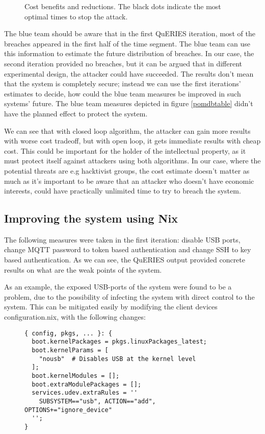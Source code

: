 \begin{figure}[t!]
\centerline{}
\caption{Cost benefits and reductions. The black dots indicate the
  most optimal times to stop the attack.}
\label{openandclosed}
\end{figure}

The blue team should be aware that in the first QuERIES iteration,
most of the breaches appeared in the first half of the time
segment. The blue team can use this information to estimate the future
distribution of breaches. In our case, the second iteration provided
no breaches, but it can be argued that in different experimental
design, the attacker could have succeeded. The results don't mean
that the system is completely secure; instead we can use the first
iterations' estimates to decide, how could the blue team measures be
improved in such systems' future. The blue team measures depicted in
figure \ref{pomdbtable} didn't have the planned effect to protect the
system. 

We can see that with closed loop algorithm, the attacker can gain more
results with worse cost tradeoff, but with open loop, it gets
immediate results with cheap cost. This could be important for the
holder of the intellectual property, as it must protect itself against
attackers using both algorithms. In our case, where the potential
threats are e.g hacktivist groups, the cost estimate doesn't matter as
much as it's important to be aware that an attacker who 
doesn't have economic interests, could have practically unlimited time
to try to breach the system.

\subsection{Improving the system using Nix}\label{improvingwithnix}

The following measures were taken in the first iteration: disable USB
ports, change MQTT password to token based authentication and change
SSH to key based authentication. As we can see, the QuERIES output
provided concrete results on what are the weak points of the system.

As an example, the exposed USB-ports of the system were found to be a
problem, due to the possibility of infecting the system with direct
control to the system. This can be mitigated easily by modifying the
client devices configuration.nix, with the following changes:

\begin{figure}[H]
\begin{lstlisting} 
{ config, pkgs, ... }: {
  boot.kernelPackages = pkgs.linuxPackages_latest;
  boot.kernelParams = [
    "nousb"  # Disables USB at the kernel level
  ];
  boot.kernelModules = [];
  boot.extraModulePackages = [];
  services.udev.extraRules = ''
    SUBSYSTEM=="usb", ACTION=="add", OPTIONS+="ignore_device"
  '';
}
\end{lstlisting}
\label{kernelsnippet}
\end{figure}

